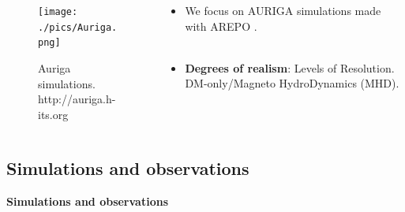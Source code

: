 \documentclass[xcolor=dvipsnames]{beamer}
\begin{document}
\begin{frame}

\begin{columns}[c]

\begin{column}{.5\textwidth}
\begin{figure}
\texttt{[image: ./pics/Auriga.png]}
\caption{\tiny Auriga simulations. http://auriga.h-its.org}
\end{figure}
\end{column}

\begin{column}{.6\textwidth}
\centering
\footnotesize
\begin{itemize}


\item We focus on AURIGA \cite{auriga} simulations made with AREPO \cite{arepo}.\\~\\

\item \textbf{Degrees of realism}: Levels of Resolution. DM-only/Magneto HydroDynamics (MHD).\\~\\

\end{itemize}

\end{column}

\end{columns}

\end{frame}

\subsection{Simulations and observations}
\begin{frame}
\centering
\LARGE
\textbf{Simulations and observations}
\normalsize
\end{frame}
\end{document}
